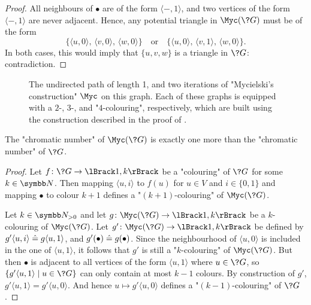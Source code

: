 \begin{proof}
	All neighbours of $\bullet$ are of the form $\langle -, 1\rangle$,
	and two vertices of the form $\langle -, 1\rangle$ are never adjacent.
	Hence, any potential triangle in $\Myc(\?G)$ must be of the form
	\[
	\{
		\langle u, 0 \rangle,\,
		\langle v, 0 \rangle,\,
		\langle w, 0 \rangle
	\}
	\quad\text{or}\quad
	\{
		\langle u, 0 \rangle,\,
		\langle v, 1 \rangle,\,
		\langle w, 0 \rangle
	\}.
	\]
	In both cases, this would imply that $\{u,v,w\}$ is a triangle in $\?G$:
	contradiction.
\end{proof}

\begin{figure}
	\centering
	\begin{tikzpicture}
		
	\end{tikzpicture}
	\caption{
		\AP\label{fig:Mycielski}
		The undirected path of length 1,
		and two iterations of "Mycielski's construction" $\Myc$ on this graph.
		Each of these graphs is equipped with a $2$-, $3$-, and "$4$-colouring", respectively, 
		which are built using the construction described in the proof
		of .
	}
\end{figure}

\begin{property}
	\label{prop:chromatic-number}
	The "chromatic number" of $\Myc(\?G)$
	is exactly one more than the "chromatic number" of $\?G$.
\end{property}

\begin{proof}
  Let $f\colon \?G \to \lBrack 1,k \rBrack$ be a "colouring" of $\?G$ for some $k\in \N$.
  Then mapping $\langle u, i \rangle$ to $f(u)$ for $u \in V$ and $i \in \{0,1\}$
  and mapping $\bullet$ to colour $k+1$ defines a "$(k+1)$-colouring" of $\Myc(\?G)$.

  Let $k \in \Np$ and let $g\colon \Myc(\?G) \to \lBrack 1,k\rBrack$ be a
  $k$-colouring of $\Myc(\?G)$.
  Let $g'\colon \Myc(\?G) \to \lBrack 1,k\rBrack$
  be defined by $g'\langle u,i\rangle \defeq g\langle u,1 \rangle$,
  and $g'(\bullet) \defeq g(\bullet)$.
  Since the neighbourhood of $\langle u,0 \rangle$ is included in the
  one of $\langle u,1 \rangle$, it follows that $g'$ is still a "$k$-colouring"
  of $\Myc(\?G)$. But then $\bullet$ is adjacent to all vertices of the form $\langle u, 1\rangle$
  where $u\in \?G$, so $\{g'\langle u, 1\rangle \mid u \in \?G\}$ can only contain at most $k-1$ colours.
  By construction of $g'$, $g'\langle u, 1\rangle = g'\langle u, 0\rangle$.
  And hence $u \mapsto g' \langle u,0 \rangle$ defines a "$(k-1)$-colouring" of $\?G$.
\end{proof}

